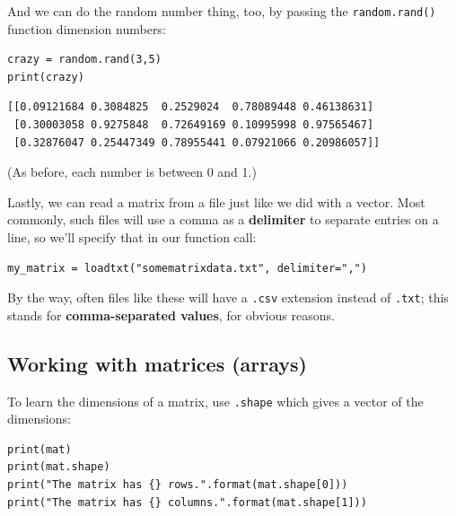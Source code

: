 And we can do the random number thing, too, by passing the
\texttt{random.rand()} function dimension numbers:

\begin{Verbatim}[fontsize=\small,samepage=true,frame=single,framesep=3mm]
crazy = random.rand(3,5)
print(crazy)
\end{Verbatim}
\vspace{-.2in}

\begin{Verbatim}[fontsize=\small,samepage=true,frame=leftline,framesep=5mm,framerule=1mm]
[[0.09121684 0.3084825  0.2529024  0.78089448 0.46138631]
 [0.30003058 0.9275848  0.72649169 0.10995998 0.97565467]
 [0.32876047 0.25447349 0.78955441 0.07921066 0.20986057]]
\end{Verbatim}

(As before, each number is between 0 and 1.)

\medskip
{}

Lastly, we can read a matrix from a file just like we did with a vector. Most
commonly, such files will use a comma as a \textbf{delimiter} to separate
entries on a line, so we'll specify that in our function call:

\begin{Verbatim}[fontsize=\small,samepage=true,frame=single,framesep=3mm]
my_matrix = loadtxt("somematrixdata.txt", delimiter=",")
\end{Verbatim}


By the way, often files like these will have a \texttt{.csv} extension instead
of \texttt{.txt}; this stands for \textbf{comma-separated values}, for obvious
reasons.


\subsection*{Working with matrices (arrays)}


To learn the dimensions of a matrix, use \texttt{.shape} which gives a vector
of the dimensions:

\begin{Verbatim}[fontsize=\small,samepage=true,frame=single,framesep=3mm]
print(mat)
print(mat.shape)
print("The matrix has {} rows.".format(mat.shape[0]))
print("The matrix has {} columns.".format(mat.shape[1]))
\end{Verbatim}
\vspace{-.2in}

